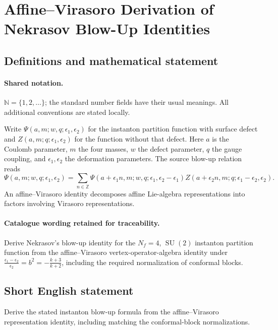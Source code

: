 \documentclass[11pt]{article}
\begin{document}
\section{Affine–Virasoro Derivation of Nekrasov Blow-Up Identities}\label{statement}

\subsection{Definitions and mathematical statement}

\paragraph{Shared notation.}$\mathbb N=\{1,2,\ldots\}$; the standard number fields have their usual meanings. All additional conventions are stated locally.


Write $\Psi(a,m;w,q;\epsilon_1,\epsilon_2)$ for the instanton partition function with surface defect and $Z(a,m;q;\epsilon_1,\epsilon_2)$ for the function without that defect. Here $a$ is the Coulomb parameter, $m$ the four masses, $w$ the defect parameter, $q$ the gauge coupling, and $\epsilon_1,\epsilon_2$ the deformation parameters. The source blow-up relation reads
\[
\Psi(a,m;w,q;\epsilon_1,\epsilon_2)=\sum_{n\in\mathbb Z}
\Psi(a+\epsilon_1n,m;w,q;\epsilon_1,\epsilon_2-\epsilon_1)
Z(a+\epsilon_2n,m;q;\epsilon_1-\epsilon_2,\epsilon_2).
\]
An affine--Virasoro identity decomposes affine Lie-algebra representations into factors involving Virasoro representations.

\paragraph{Catalogue wording retained for traceability.}
Derive Nekrasov's blow-up identity for the $N_f=4$, $\operatorname{SU}(2)$ instanton partition function from the affine–Virasoro vertex-operator-algebra identity under $\frac{\epsilon_1-\epsilon_2}{\epsilon_2}=b^2=-\frac{k+3}{k+2}$, including the required normalization of conformal blocks.
\subsection{Short English statement}
Derive the stated instanton blow-up formula from the affine--Virasoro representation identity, including matching the conformal-block normalizations.
\end{document}
